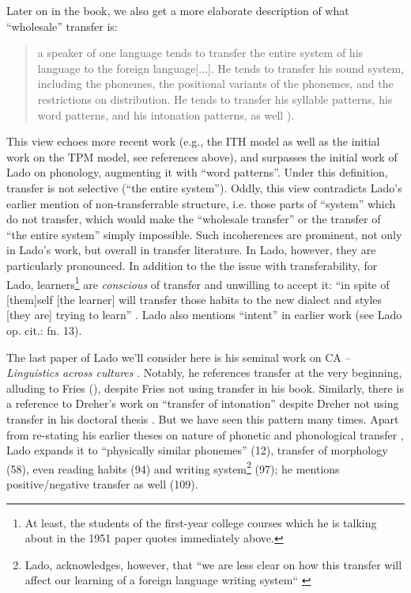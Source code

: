 \documentclass{article}
\begin{document}
Later on in the book, we also get a more elaborate description of what ``wholesale'' transfer is:
\begin{quote}
    a speaker of one language tends to transfer the entire system of his language to the foreign language[...]. He tends to transfer his sound system, including the phonemes, the positional variants of the phonemes, and the restrictions on distribution. He tends to transfer his syllable patterns, his word patterns, and his intonation patterns, as well \citep[][p. 26]{lado_comparison_1956}).
\end{quote}

This view echoes more recent work (e.g., the ITH model \citep{leung_third_2007} as well as the initial work on the TPM model, see references above), and surpasses the initial work of Lado on phonology, augmenting it with ``word patterns''. Under this definition, transfer is not selective (``the entire system''). Oddly, this view contradicts Lado's earlier \citep{lado_testing_1951} mention of non-transferrable structure, i.e. those parts of ``system'' which do not transfer, which would make the ``wholesale transfer'' or the transfer of ``the entire system'' simply impossible. Such incoherences are prominent, not only in Lado’s work, but overall in transfer literature. In Lado, however, they are particularly pronounced. In addition to the the issue with transferability, for Lado, learners\footnote{At least, the students of the first-year college courses which he is talking about in the 1951 paper quotes immediately above.} are \textit{conscious} of transfer and unwilling to accept it: ``in spite of [them]self [the learner] will transfer those habits to the new dialect and styles [they are] trying to learn'' \citep[][p. 14]{lado_sentence_1957}. Lado also mentions ``intent'' in earlier work (see Lado op. cit.: fn. 13).

The last paper of Lado we’ll consider here is his seminal work on CA -- \textit{Linguistics across cultures} \citep{lado_linguistics_1957}. Notably, he references transfer at the very beginning, alluding to Fries (\citeyear{fries_teaching_1945}), despite Fries not using transfer in his book. Similarly, there is a reference to Dreher’s work on ``transfer of intonation'' despite Dreher not using transfer in his doctoral thesis \citep{dreher_comparison_1950}. But we have seen this pattern many times. Apart from re-stating his earlier theses on nature of phonetic and phonological transfer \citep[][p. 11]{lado_linguistics_1957}, Lado expands it to ``physically similar phonemes'' (12), transfer of morphology (58), even reading habits (94) and writing system\footnote{Lado, acknowledges, however, that ``we are less clear on how this transfer will affect our learning of a foreign language writing system`` \citep[][p. 97]{lado_linguistics_1957}} (97); he mentions positive/negative transfer as well (109). 
\end{document}

